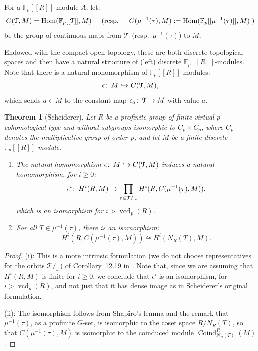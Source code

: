 \documentclass[12pt,twoside]{amsart}
\newcommand\F{{\mathbb F}}
\newcommand\hookra{\hookrightarrow}
\renewcommand{\hom}{\operatorname{Hom}}
\newcommand\cT{{\mathcal T}}
\def\co{\colon\thinspace}
\newcommand\vcd{\operatorname{vcd}}
\newtheorem{theorem}{Theorem}[section]
\theoremstyle{definition}
\begin{document}
For a $\F_p[[R]]$-module $A$, let: 
\[C(\cT,M)=\hom(\F_p[[\cT]],M)\hspace{0.5cm} (\mbox{resp.}\hspace{0.5cm} C(\mu^{-1}(\tau),M):=\hom(\F_p[[\mu^{-1}(\tau)]],M)\;)\]
be the group of continuous maps from $\cT$ (resp.\ $\mu^{-1}(\tau)$) to $M$. 

Endowed with the compact open topology, these are both discrete topological spaces and then have a natural structure 
of (left) discrete $\F_p[[R]]$-modules. Note that there is a natural monomorphism of $\F_p[[R]]$-modules: 
\[\epsilon\co M\hookra C(\cT,M),\] 
which sends $a\in M$ to the constant map $\epsilon_a\co\cT\to M$ with value $a$. 

\begin{theorem}[Scheiderer]\label{BrownRibes}Let $R$ be a profinite group of finite virtual $p$-cohomological type and
without subgroups isomorphic to $C_p\times C_p$, where $C_p$ denotes the multiplicative group of order $p$, 
and let $M$ be a finite discrete $\F_p[[R]]$-module. 
\begin{enumerate}
\item The natural homomorphism $\epsilon\co M\hookra C(\cT,M)$ induces a natural homomorphism, for $i\geq 0$: 
\[\epsilon^i\co H^i(R,M)\to\prod_{\tau\in\cT/_\sim}H^i(R,C(\mu^{-1}(\tau),M)),\]
 which is an isomorphism for $i>\vcd_p(R)$.
\item For all $T\in\mu^{-1}(\tau)$, there is an isomorphism:
\[H^i(R,C(\mu^{-1}(\tau),M))\cong H^i(N_R(T),M).\]
\end{enumerate}
\end{theorem}

\begin{proof}(i): This is a more intrinsic formulation (we do not choose representatives for the orbits $\cT/_\sim$) of Corollary~12.19 in \cite{Scheiderer}.
Note that, since we are assuming that $H^i(R,M)$ is finite for $i\geq 0$, we conclude that $\epsilon^i$ is an isomorphism, for $i>\vcd_p(R)$, and not just
that it has dense image as in Scheiderer's original formulation.
\smallskip

\noindent
(ii): The isomorphism follows from Shapiro's lemma and the remark that $\mu^{-1}(\tau)$, as a profinite $G$-set, is isomorphic to the coset space 
$R/N_R(T)$, so that $C(\mu^{-1}(\tau),M)$ is isomorphic to the coinduced module $\operatorname{Coind}^R_{N_R(T)}(M)$.
\end{proof} 
\end{document}
